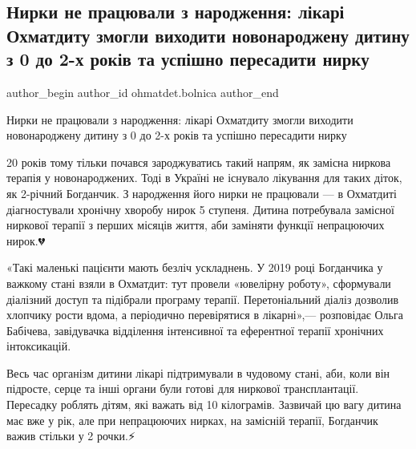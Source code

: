  
 
 
 
 
 
\subsection{Нирки не працювали з народження: лікарі Охматдиту змогли виходити новонароджену дитину з 0 до 2-х років та успішно пересадити нирку}
\label{sec:29_11_2022.fb.ohmatdet.bolnica.1.nyrky}
 
\ifcmt
 author_begin
   author_id ohmatdet.bolnica
 author_end
\fi

Нирки не працювали з народження: лікарі Охматдиту змогли виходити новонароджену
дитину з 0 до 2-х років та успішно пересадити нирку🙏🏻

20 років тому тільки почався зароджуватись такий напрям, як замісна ниркова
терапія у новонароджених. Тоді в Україні не існувало лікування для таких діток,
як 2-річний Богданчик. З народження його нирки не працювали — в Охматдиті
діагностували хронічну хворобу нирок 5 ступеня. Дитина потребувала замісної
ниркової терапії з перших місяців життя, аби заміняти функції непрацюючих
нирок.💔

«Такі маленькі пацієнти мають безліч ускладнень. У 2019 році Богданчика у
важкому стані взяли в Охматдит: тут провели «ювелірну роботу», сформували
діалізний доступ та підібрали програму терапії. Перетоніальний діаліз дозволив
хлопчику рости вдома, а періодично перевірятися в лікарні»,— розповідає Ольга
Бабічева, завідувачка відділення інтенсивної та еферентної терапії хронічних
інтоксикацій.💪🏻

Весь час організм дитини лікарі підтримували в чудовому стані, аби, коли він
підросте, серце та інші органи були готові для ниркової трансплантації.
Пересадку роблять дітям, які важать від 10 кілограмів. Зазвичай цю вагу дитина
має вже у рік, але при непрацюючих нирках, на замісній терапії, Богданчик важив
стільки у 2 рочки.⚡️

